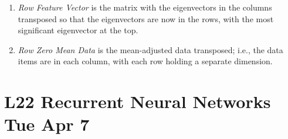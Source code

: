 \documentclass[12pt]{article}
\newenvironment{QandA}{\begin{enumerate}[label=\bfseries\arabic*.]\bfseries}
{\end{enumerate}}
\newenvironment{answered}{\par\normalfont\color{Sepia}}{}
\begin{document}
\begin{QandA}
\begin{answered}
\begin{enumerate}
            \item \textit{Row Feature Vector} is the matrix with the eigenvectors in the 
                  columns transposed so that the eigenvectors are now in the rows, 
                  with the most significant eigenvector at the top.

            \item \textit{Row Zero Mean Data} is the mean-adjusted data transposed; 
                  i.e., the data items are in each column, with each row holding 
                  a separate dimension.
        \end{enumerate}
    \end{answered}

\end{QandA}

\section*{L22 Recurrent Neural Networks \textemdash{} Tue Apr 7}
\end{document}
